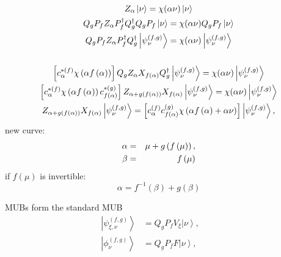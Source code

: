 \documentclass{article}
\begin{document}
\begin{gather}
Z_{\alpha }\left\vert \nu \right\rangle =\chi (\alpha \nu )\left\vert \nu
\right\rangle   \notag \\
Q_{g}P_{f}Z_{\alpha }P_{f}^{\dag }Q_{g}^{\dag }Q_{g}P_{f}\left\vert \nu
\right\rangle =\chi (\alpha \nu )Q_{g}P_{f}\left\vert \nu \right\rangle  
\notag \\
Q_{g}P_{f}Z_{\alpha }P_{f}^{\dag }Q_{g}^{\dag }\left\vert \psi _{\nu
}^{\left( f,g\right) }\right\rangle =\chi (\alpha \nu )\left\vert \psi _{\nu
}^{\left( f,g\right) }\right\rangle   \notag \\
\\
\left[ c_{\alpha }^{\ast \left( f\right) }\chi \left( \alpha f\left( \alpha
\right) \right) \right] Q_{g}Z_{\alpha }X_{f\left( \alpha \right)
}Q_{g}^{\dag }\left\vert \psi _{\nu }^{\left( f,g\right) }\right\rangle
=\chi (\alpha \nu )\left\vert \psi _{\nu }^{\left( f,g\right) }\right\rangle 
\notag \\
\left[ c_{\alpha }^{\ast \left( f\right) }\chi \left( \alpha f\left( \alpha
\right) \right) c_{f\left( \alpha \right) }^{\ast \left( g\right) }\right]
Z_{\alpha +g\left( f\left( \alpha \right) \right) }X_{f\left( \alpha \right)
}\left\vert \psi _{\nu }^{\left( f,g\right) }\right\rangle =\chi (\alpha \nu
)\left\vert \psi _{\nu }^{\left( f,g\right) }\right\rangle   \notag \\
Z_{\alpha +g\left( f\left( \alpha \right) \right) }X_{f\left( \alpha \right)
}\left\vert \psi _{\nu }^{\left( f,g\right) }\right\rangle =\left[ c_{\alpha
}^{\left( f\right) }c_{f\left( \alpha \right) }^{\left( g\right) }\chi
\left( \alpha f\left( \alpha \right) +\alpha \nu \right) \right] \left\vert
\psi _{\nu }^{\left( f,g\right) }\right\rangle ,
\end{gather}%
new curve: 
\begin{eqnarray}
\alpha  &=&\mu +g\left( f\left( \mu \right) \right) ,  \label{curve1} \\
\beta  &=&f\left( \mu \right)   \notag
\end{eqnarray}%
if $f\left( \mu \right) $ is invertible:%
\begin{equation*}
\alpha =f^{-1}(\beta )+g\left( \beta \right) 
\end{equation*}

MUBs form the standard MUB%
\begin{align*}
\left\vert \psi _{\xi ,\nu }^{\left( f,g\right) }\right\rangle &
=Q_{g}P_{f}V_{\xi }\left\vert \nu \right\rangle ,\qquad \\
\left\vert \phi _{\nu }^{\left( f,g\right) }\right\rangle &
=Q_{g}P_{f}F\left\vert \nu \right\rangle ,
\end{align*}
\end{document}
